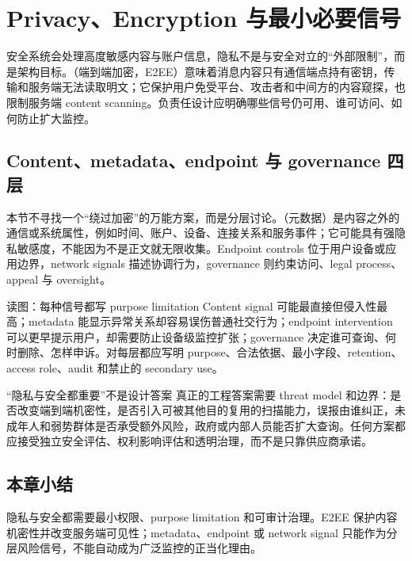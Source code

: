 \section{Privacy、Encryption 与最小必要信号}

安全系统会处理高度敏感内容与账户信息，隐私不是与安全对立的“外部限制”，而是架构目标。（端到端加密，E2EE）意味着消息内容只有通信端点持有密钥，传输和服务端无法读取明文；它保护用户免受平台、攻击者和中间方的内容窥探，也限制服务端 content scanning。负责任设计应明确哪些信号仍可用、谁可访问、如何防止扩大监控。

\subsection{Content、metadata、endpoint 与 governance 四层}

本节不寻找一个“绕过加密”的万能方案，而是分层讨论。（元数据）是内容之外的通信或系统属性，例如时间、账户、设备、连接关系和服务事件；它可能具有强隐私敏感度，不能因为不是正文就无限收集。Endpoint controls 位于用户设备或应用边界，network signals 描述协调行为，governance 则约束访问、legal process、appeal 与 oversight。


\begin{knowledgebox}{读图：每种信号都写 purpose limitation}
Content signal 可能最直接但侵入性最高；metadata 能显示异常关系却容易误伤普通社交行为；endpoint intervention 可以更早提示用户，却需要防止设备级监控扩张；governance 决定谁可查询、何时删除、怎样申诉。对每层都应写明 purpose、合法依据、最小字段、retention、access role、audit 和禁止的 secondary use。
\end{knowledgebox}

\begin{warningbox}{“隐私与安全都重要”不是设计答案}
真正的工程答案需要 threat model 和边界：是否改变端到端机密性，是否引入可被其他目的复用的扫描能力，误报由谁纠正，未成年人和弱势群体是否承受额外风险，政府或内部人员能否扩大查询。任何方案都应接受独立安全评估、权利影响评估和透明治理，而不是只靠供应商承诺。
\end{warningbox}


\subsection{本章小结}

隐私与安全都需要最小权限、purpose limitation 和可审计治理。E2EE 保护内容机密性并改变服务端可见性；metadata、endpoint 或 network signal 只能作为分层风险信号，不能自动成为广泛监控的正当化理由。

